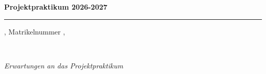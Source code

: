 \documentclass[pdftex,12pt,twoside,footsepline,headsepline,a4paper,final]{scrreprt}
\begin{document}
\begin{huge}
\textbf{Projektpraktikum 2026-2027}
\end{huge}

\par\noindent\rule{\textwidth}{0.4pt}

\IhrName, Matrikelnummer \Matrikelnummer, \Studiengang

$_{}$

\begin{Large}
\textcolor[rgb]{0.31,0.51,0.74}{\emph{Erwartungen an das Projektpraktikum}}
\end{Large}

$_{}$


\end{document}
